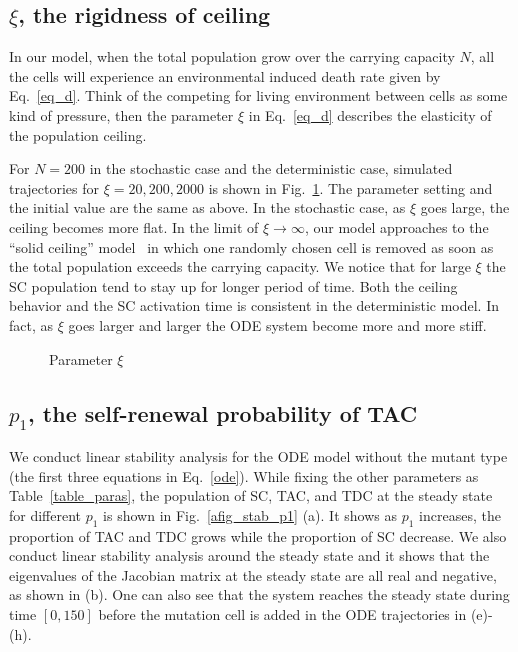 \documentclass[12pt]{article}
\begin{document}
\subsection*{$\xi$, the rigidness of ceiling}
In our model, when the total population grow over the
carrying capacity $N$, all the cells will experience an
environmental induced death rate given by Eq.~\eqref{eq_d}.
Think of the competing for living environment between cells
as some kind of pressure, then the parameter $\xi$ in 
Eq.~\eqref{eq_d} describes the elasticity of the 
population ceiling.

For $N=200$ in the stochastic case 
and the deterministic case, simulated
trajectories for $\xi = 20, 200, 2000$ is shown in
Fig.~\ref{afig_paraxi}. The parameter setting
and the initial value are the same as above.
In the stochastic case, 
as $\xi$ goes large, the ceiling becomes
more flat. In the limit of $\xi\rightarrow\infty$,
our model approaches to the ``solid ceiling'' model~\cite{Lindenmayer95}
in which one randomly chosen cell is removed as soon as
the total population exceeds the carrying capacity.
We notice that for large $\xi$ the SC population tend 
to stay up for longer period of time. Both the 
ceiling behavior and the SC activation time
is consistent in the deterministic model. In fact,
as $\xi$ goes larger and larger the ODE system become
more and more stiff. 

\begin{figure}
\centering
{}
\caption{Parameter $\xi$}
\label{afig_paraxi}
\end{figure}

\subsection*{$p_1$, the self-renewal probability of TAC}
We conduct linear stability analysis for the ODE model 
without the mutant type (the first three equations in Eq.~\eqref{ode}).
While fixing the other parameters as Table~\ref{table_paras}, 
the population of SC, TAC, and TDC at the steady state for 
different $p_1$ is shown in Fig.~\ref{afig_stab_p1} (a). 
It shows as $p_1$ increases, the proportion of TAC and TDC 
grows while the proportion of SC decrease. 
We also conduct linear stability analysis around the
steady state and it shows that the eigenvalues of the Jacobian
matrix at the steady state are all real and negative, 
as shown in (b). One can also see
that the system reaches the steady state during time $[0, 150]$ 
before the mutation cell is added in the ODE trajectories in (e)-(h).
\end{document}
